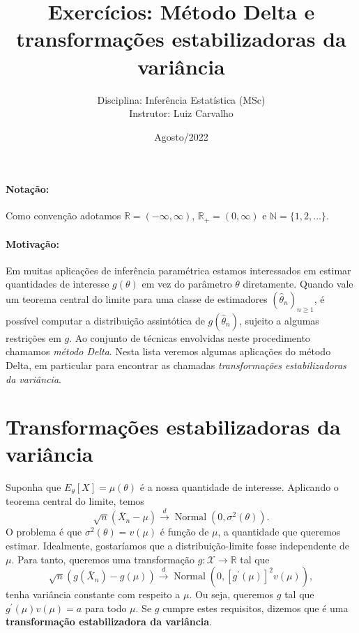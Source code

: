 \documentclass[a4paper,10pt, notitlepage]{report}
\title{Exercícios: Método Delta e transformações estabilizadoras da variância}
\author{Disciplina: Inferência Estatística (MSc) \\ Instrutor: Luiz Carvalho}
\date{Agosto/2022}
\newcommand{\rpl}{\mathbb{R}_+}
\begin{document}
\maketitle


\paragraph{Notação:} Como convenção adotamos $\mathbb{R} = (-\infty, \infty)$, $\rpl = (0, \infty)$ e $\mathbb{N} = \{1, 2, \ldots \}$.

\paragraph{Motivação:} Em muitas aplicações de inferência paramétrica estamos interessados em estimar quantidades de interesse $g(\theta)$ em vez do parâmetro $\theta$ diretamente.
Quando vale um teorema central do limite para uma classe de estimadores $(\hat{\theta}_n)_{n\geq1}$, é possível computar a distribuição assintótica de $g(\hat{\theta}_n)$, sujeito a algumas restrições em $g$.
Ao conjunto de técnicas envolvidas neste procedimento chamamos \textit{método Delta}.
Nesta lista veremos algumas aplicações do método Delta, em particular para encontrar as chamadas \textit{transformações estabilizadoras da variância}.

\section*{Transformações estabilizadoras da variância}

Suponha que $E_\theta[X] = \mu(\theta)$ é a nossa quantidade de interesse.
 Aplicando o teorema central do limite, temos
 \begin{equation}
   \sqrt{n}\left(\bar{X}_n -\mu\right)  \xrightarrow{d} \operatorname{Normal}(0, \sigma^2(\theta)).
 \end{equation}
 O problema é que $\sigma^2(\theta) = v(\mu)$ é função de $\mu$, a quantidade que queremos estimar. 
 Idealmente, gostaríamos que a distribuição-limite fosse independente de $\mu$.
 Para tanto, queremos uma transformação $g : \mathcal{X} \to \mathbb{R}$ tal que
  \begin{equation}
   \sqrt{n}\left(g(\bar{X}_n) -g(\mu)\right)  \xrightarrow{d} \operatorname{Normal}\left(0, [g^\prime(\mu)]^2v(\mu)\right),
 \end{equation}
 tenha variância constante com respeito a $\mu$.
 Ou seja, queremos $g$ tal que $g^\prime(\mu)v(\mu) = a$ para todo $\mu$.
 Se $g$ cumpre estes requisitos, dizemos que é uma \textbf{transformação estabilizadora da variância}.
\end{document}

